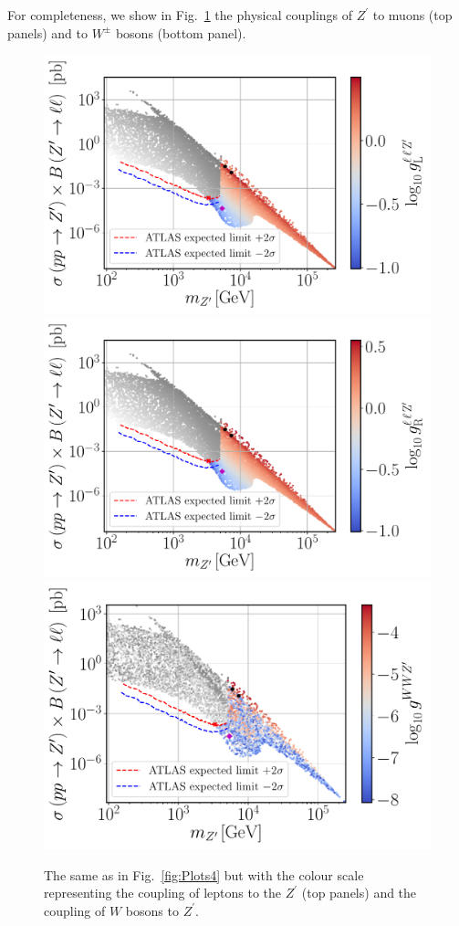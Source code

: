 \documentclass[a4paper,11pt]{article}
\renewcommand{\[}{\left[}
\renewcommand{\]}{\right]}
\begin{document}
For completeness, we show in Fig.~\ref{fig:Plots2} the physical couplings of $Z^\prime$ to muons (top panels) and to $W^\pm$ bosons (bottom panel).
\begin{figure}[!htb]
	\centering
	\includegraphics[scale=0.37]{mZp_Xsec_gLmumuZ.pdf}
	\includegraphics[scale=0.37]{mZp_Xsec_gRmumuZ.pdf}
	\includegraphics[scale=0.37]{mZp_Xsec_gWWZp.pdf}
	\caption{The same as in Fig.~\ref{fig:Plots4} but with the colour scale representing the coupling of leptons to the $Z^\prime$ (top panels) and the coupling of $W$ bosons to $Z^\prime$.}
	\label{fig:Plots2}
\end{figure}	
\end{document}
